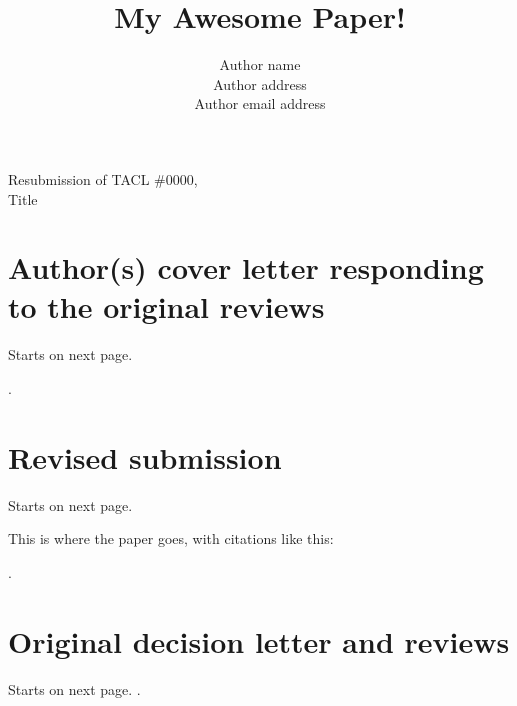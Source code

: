 \documentclass[11pt,letterpaper]{article}
\title{My Awesome Paper!}
\author{
  Author name \\
  Author address \\
  Author email address
}
\date{}
\begin{document}
\begin{parbox}{2.2\linewidth}
  \centering
\begin{center}
{\LARGE
  \hspace{4cm} Resubmission of TACL \#0000, \\
Title \\
}
\end{center}

\tableofcontents

\part{Author(s) cover letter responding to the original reviews} Starts on next page.
\end{parbox}
\newpage
.
\newpage
\newpage


\newpage

\part{Revised submission} Starts on next page.
\newpage

\maketitle

\citetrackerfalse\pagetrackerfalse\backtrackerfalse

This is where the paper goes, with citations like this: \cite{ptb}

\citetrackertrue\pagetrackertrue\backtrackertrue

\newrefcontext[sorting=nyt]
\printbibliography

\newpage
.
\newpage
\newpage
\part{Original decision letter and reviews} Starts on next page.
\newpage
.
\newpage

\end{document}

